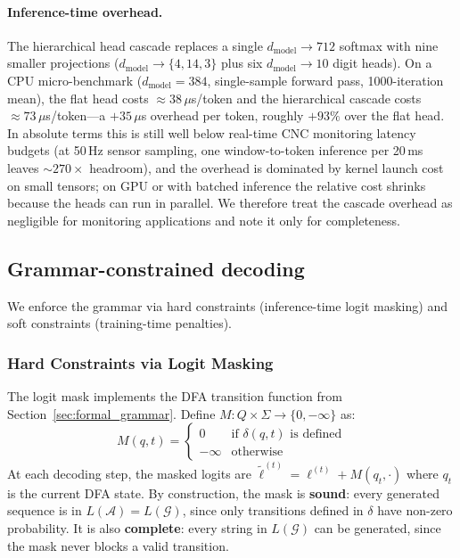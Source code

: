 \documentclass[11pt]{article}
\begin{document}
\paragraph{Inference-time overhead.}
The hierarchical head cascade replaces a single $d_{\text{model}} \to 712$ softmax with nine smaller projections ($d_{\text{model}} \to \{4, 14, 3\}$ plus six $d_{\text{model}} \to 10$ digit heads). On a CPU micro-benchmark ($d_{\text{model}} = 384$, single-sample forward pass, 1000-iteration mean), the flat head costs $\approx\!38\,\mu$s/token and the hierarchical cascade costs $\approx\!73\,\mu$s/token---a $+35\,\mu$s overhead per token, roughly $+93\%$ over the flat head. In absolute terms this is still well below real-time CNC monitoring latency budgets (at 50\,Hz sensor sampling, one window-to-token inference per 20\,ms leaves $\sim 270\times$ headroom), and the overhead is dominated by kernel launch cost on small tensors; on GPU or with batched inference the relative cost shrinks because the heads can run in parallel. We therefore treat the cascade overhead as negligible for monitoring applications and note it only for completeness.

\subsection{Grammar-constrained decoding}
\label{sec:constrained_decoding}

We enforce the grammar via hard constraints (inference-time logit masking) and soft constraints (training-time penalties).

\subsubsection{Hard Constraints via Logit Masking}

The logit mask implements the DFA transition function from Section~\ref{sec:formal_grammar}. Define $M: Q \times \Sigma \to \{0, -\infty\}$ as:
\begin{equation}
    M(q, t) = \begin{cases} 0 & \text{if } \delta(q, t) \text{ is defined} \\ -\infty & \text{otherwise} \end{cases}
\end{equation}
At each decoding step, the masked logits are $\tilde{\ell}^{(t)} = \ell^{(t)} + M(q_t, \cdot)$ where $q_t$ is the current DFA state. By construction, the mask is \textbf{sound}: every generated sequence is in $L(\mathcal{A}) = L(\mathcal{G})$, since only transitions defined in $\delta$ have non-zero probability. It is also \textbf{complete}: every string in $L(\mathcal{G})$ can be generated, since the mask never blocks a valid transition.
\end{document}
